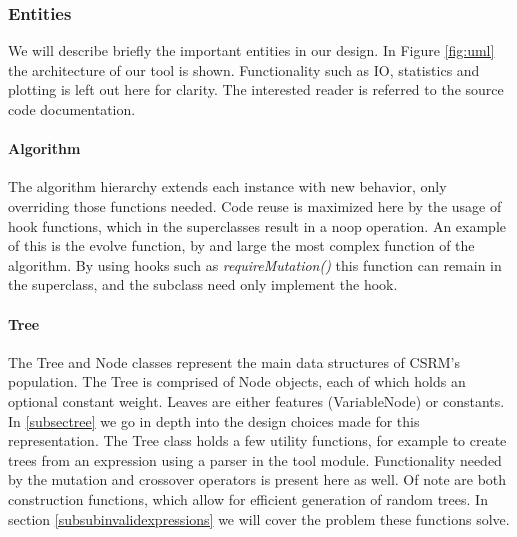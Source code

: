 \subsubsection{Entities}
We will describe briefly the important entities in our design. In Figure \ref{fig:uml} the architecture of our tool is shown. Functionality such as IO, statistics and plotting is left out here for clarity. The interested reader is referred to the source code documentation.
\paragraph{Algorithm}
The algorithm hierarchy extends each instance with new behavior, only overriding those functions needed. Code reuse is maximized here by the usage of hook functions, which in the superclasses result in a noop operation. An example of this is the evolve function, by and large the most complex function of the algorithm. By using hooks such as \textit{requireMutation()} this function can remain in the superclass, and the subclass need only implement the hook.
\paragraph{Tree}
The Tree and Node classes represent the main data structures of CSRM's population. The Tree is comprised of Node objects, each of which holds an optional constant weight. Leaves are either features (VariableNode) or constants. 
In \ref{subsectree} we go in depth into the design choices made for this representation.
The Tree class holds a few utility functions, for example to create trees from an expression using a parser in the tool module.
Functionality needed by the mutation and crossover operators is present here as well. Of note are both construction functions, which allow for efficient generation of random trees. In section \ref{subsubinvalidexpressions} we will cover the problem these functions solve.

